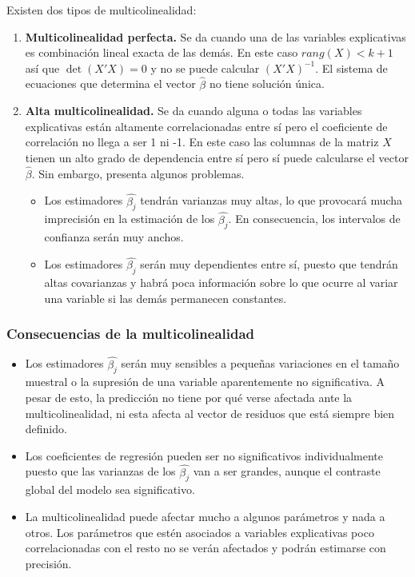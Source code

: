 \documentclass{report}
\theoremstyle{remark}
\theoremstyle{remark}
\theoremstyle{remark}
\theoremstyle{definition}
\theoremstyle{definition}
\theoremstyle{definition}
\begin{document}
Existen dos tipos de multicolinealidad:
\begin{enumerate}
    \item \textbf{Multicolinealidad perfecta.}
          Se da cuando una de las variables explicativas es combinación lineal exacta de las demás.
          En este caso $rang(X) < k+1$ así que $\det(X'X) = 0$ y no se puede calcular $(X'X)^{-1}$.
          El sistema de ecuaciones que determina el vector $\hat{\beta}$ no tiene solución única.
    \item \textbf{Alta multicolinealidad.}
          Se da cuando alguna o todas las variables explicativas están altamente correlacionadas entre sí pero el coeficiente de correlación no llega a ser 1 ni -1.
          En este caso las columnas de la matriz $X$ tienen un alto grado de dependencia entre sí pero sí puede calcularse el vector $\hat{\beta}$.
          Sin embargo, presenta algunos problemas.
          \begin{itemize}
              \item Los estimadores $\hat{\beta_j}$ tendrán varianzas muy altas, lo que provocará mucha imprecisión en la estimación de los $\hat{\beta_j}$.
                    En consecuencia, los intervalos de confianza serán muy anchos.
              \item Los estimadores $\hat{\beta_j}$ serán muy dependientes entre sí, puesto que tendrán altas covarianzas y habrá poca información sobre lo que ocurre al variar una variable si las demás permanecen constantes.
          \end{itemize}
\end{enumerate}

\subsubsection*{Consecuencias de la multicolinealidad}
\begin{itemize}
    \item Los estimadores $\hat{\beta_j}$ serán muy sensibles a pequeñas variaciones en el tamaño muestral o la supresión de una variable aparentemente no significativa.
          A pesar de esto, la predicción no tiene por qué verse afectada ante la multicolinealidad, ni esta afecta al vector de residuos que está siempre bien definido.
    \item Los coeficientes de regresión pueden ser no significativos individualmente puesto que las varianzas de los $\hat{\beta_j}$ van a ser grandes, aunque el contraste global del modelo sea significativo.
    \item La multicolinealidad puede afectar mucho a algunos parámetros y nada a otros.
          Los parámetros que estén asociados a variables explicativas poco correlacionadas con el resto no se verán afectados y podrán estimarse con precisión.
\end{itemize}
\end{document}
